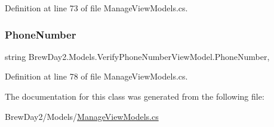 Definition at line 73 of file Manage\+View\+Models.\+cs.

\mbox{\label{class_brew_day2_1_1_models_1_1_verify_phone_number_view_model_aab23d14bd66a710641964744c70b4ca3}} 
\subsubsection{\texorpdfstring{Phone\+Number}{PhoneNumber}}
{\footnotesize\ttfamily string Brew\+Day2.\+Models.\+Verify\+Phone\+Number\+View\+Model.\+Phone\+Number\hspace{0.3cm}{\ttfamily [get]}, {\ttfamily [set]}}



Definition at line 78 of file Manage\+View\+Models.\+cs.



The documentation for this class was generated from the following file\+:\begin{DoxyCompactItemize}
\item 
Brew\+Day2/\+Models/\mbox{\hyperlink{_manage_view_models_8cs}{Manage\+View\+Models.\+cs}}\end{DoxyCompactItemize}
